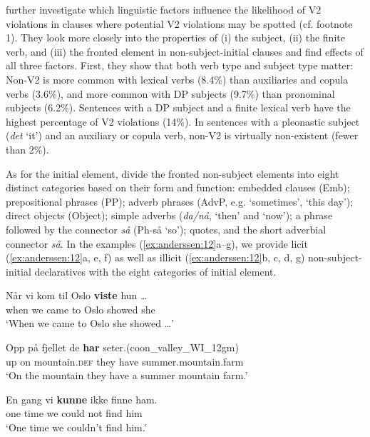 \documentclass[output=paper]{langscibook}
\begin{document}
\citet{WestergaardEtAl2021} further investigate which linguistic factors influence the likelihood of V2 violations in clauses where potential V2 violations may be spotted (cf. footnote 1). They look more closely into the properties of (i) the subject, (ii) the finite verb, and (iii) the fronted element in non\hyp subject\hyp initial clauses and find effects of all three factors. First, they show that both verb type and subject type matter: Non-V2 is more common with lexical verbs (8.4\%) than auxiliaries and copula verbs (3.6\%), and more common with DP subjects (9.7\%) than pronominal subjects (6.2\%). Sentences with a DP subject and a finite lexical verb have the highest percentage of V2 violations (14\%). In sentences with a pleonastic subject (\textit{det} `it') and an auxiliary or copula verb, non-V2 is virtually non-existent (fewer than 2\%). 

As for the initial element, \citet{WestergaardEtAl2021} divide the fronted non-subject elements into eight distinct categories based on their form and function:  embedded clauses (Emb);  prepositional phrases (PP);  adverb phrases (AdvP, e.g. ‘sometimes’, ‘this day’);  direct objects (Object);  simple adverbs (\textit{da/nå}, ‘then’ and ‘now’);  a phrase followed by the connector \textit{så} (Ph-så ‘so’);  quotes, and  the short adverbial connector \textit{så}. In the examples (\ref{ex:anderssen:12}a--g), we provide licit (\ref{ex:anderssen:12}a, e, f) as well as illicit (\ref{ex:anderssen:12}b, c, d, g) non\hyp subject\hyp initial declaratives with the eight categories of initial element.

\ea%
    \label{ex:anderssen:12}
    \ea \gll Når   vi   kom   til Oslo \textbf{viste}     hun  …\\
             when we came to Oslo showed she\\
\glt    ‘When we came to Oslo she showed …’

  \ex \gll Opp på fjellet              de    \textbf{har}   {seter.\hspace*{1.1115cm}(coon\_valley\_WI\_12gm)}\\
    up   on  mountain.\textsc{def} they have summer.mountain.farm\\
\glt    ‘On the mountain they have a summer mountain farm.’

  \ex  \gll En  gang vi  \textbf{kunne} ikke finne ham.\\
    one time we could   not  find   him\\
\glt    ‘One time we couldn’t find him.’
\end{document}
